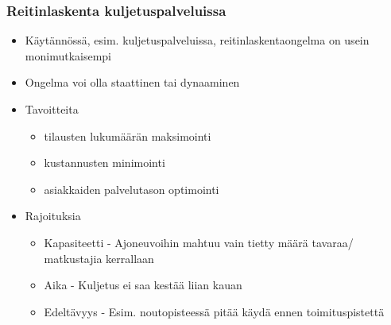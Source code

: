 \documentclass{beamer}
\begin{document}
    
%     
%     

\begin{frame}
    \frametitle{Reitinlaskenta kuljetuspalveluissa}
    \begin{itemize}
    \item
    Käytännössä, esim. kuljetuspalveluissa, reitinlaskentaongelma on usein monimutkaisempi
    \item
    Ongelma voi olla staattinen tai dynaaminen
    \item
    Tavoitteita
    \begin{itemize}
     \item 
     tilausten lukumäärän maksimointi
     \item
     kustannusten minimointi
     \item
     asiakkaiden palvelutason optimointi
    \end{itemize}
    \item
    Rajoituksia
    \begin{itemize}
\item 
Kapasiteetti - Ajoneuvoihin mahtuu vain tietty määrä tavaraa/ matkustajia kerrallaan
\item
Aika - Kuljetus ei saa kestää liian kauan
\item
Edeltävyys - Esim. noutopisteessä pitää käydä ennen toimituspistettä
\end{itemize}
  \end{itemize}

\end{frame}
\end{document}
